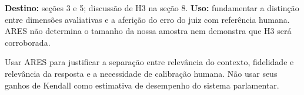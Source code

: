 \textbf{Destino:} seções 3 e 5; discussão de H3 na seção 8.
\textbf{Uso:} fundamentar a distinção entre dimensões avaliativas e a aferição do erro do juiz com referência humana. ARES não determina o tamanho da nossa amostra nem demonstra que H3 será corroborada.

Usar ARES para justificar a separação entre relevância do contexto, fidelidade e relevância da resposta e a necessidade de calibração humana. Não usar seus ganhos de Kendall como estimativa de desempenho do sistema parlamentar.

